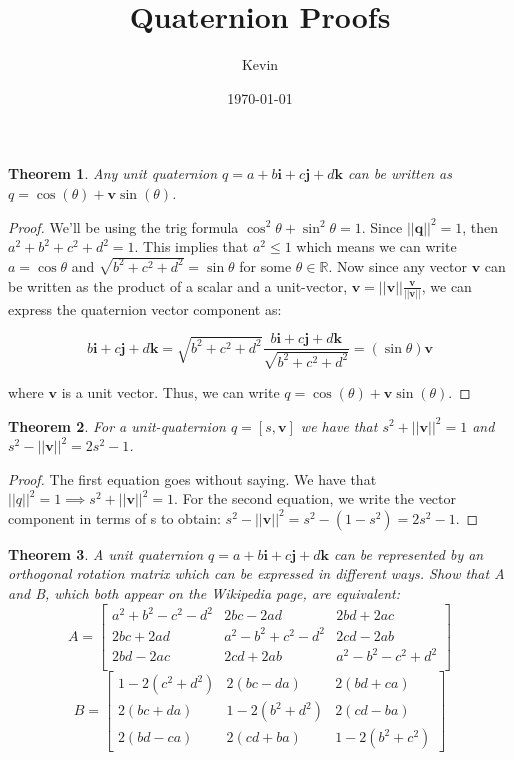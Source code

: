 \documentclass[a4paper,12pt]{article}
\author{Kevin}
\title{Quaternion Proofs}
\date{\today}
\newtheorem{theorem}{Theorem}
\begin{document}
\maketitle

\begin{theorem}
Any unit quaternion $q = a + b \mathbf{i} + c \mathbf{j} + d \mathbf{k}$ can be written as $q = \cos{(\theta)} + \mathbf{v}\sin{(\theta)}$.
\end{theorem}

\begin{proof}
We'll be using the trig formula $\cos^2\theta + \sin^2\theta = 1$. Since $||\mathbf{q}||^2 = 1$, then $a^2 + b^2 + c^2 + d^2 = 1$. This implies that $a^2 \leq1$ which means we can write $a = \cos{\theta}$ and $\sqrt{b^2 + c^2 + d^2} = \sin{\theta}$ for some $\theta \in \mathbb{R}$. Now since any vector $\mathbf{v}$ can be written as the product of a scalar and a unit-vector, $\mathbf{v}= ||\mathbf{v}|| \frac{\mathbf{v}}{||\mathbf{v}||}$, we can express the quaternion vector component as:

$$b \mathbf{i} + c \mathbf{j} + d \mathbf{k} = \sqrt{b^2 + c^2 + d^2} \frac{b \mathbf{i} + c \mathbf{j} + d \mathbf{k} }{\sqrt{b^2 + c^2 + d^2}} = (\sin{\theta})\mathbf{v}
$$

where $\mathbf{v}$ is a unit vector. Thus, we can write $q = \cos{(\theta)} + \mathbf{v}\sin{(\theta)}.$
\end{proof}

\begin{theorem}
For a unit-quaternion $q = [s, \mathbf{v}]$ we have that $s^2 + ||\mathbf{v}||^2 = 1$ and $s^2 - ||\mathbf{v}||^2 = 2s^2 -1$.
\end{theorem}

\begin{proof}
The first equation goes without saying. We have that $||q||^2 = 1 \implies s^2 + ||\mathbf{v}||^2 = 1.$ For the second equation, we write the vector component in terms of s to obtain: $s^2 - ||\mathbf{v}||^2 = s^2 - (1 - s^2) = 2s^2 - 1$.
\end{proof}

\begin{theorem}
A unit quaternion $q = a + b\mathbf{i} + c\mathbf{j} + d\mathbf{k}$ can be represented by an orthogonal rotation matrix which can be expressed in different ways. Show that A and B, which both appear on the Wikipedia page, are equivalent:
$$
A = \begin{bmatrix}
a^2+b^2-c^2-d^2&2bc-2ad        &2bd+2ac        \\
2bc+2ad        &a^2-b^2+c^2-d^2&2cd-2ab        \\
2bd-2ac        &2cd+2ab        &a^2-b^2-c^2+d^2\\
\end{bmatrix}
$$
$$
B = \begin{bmatrix}
1 - 2(c^2 + d^2) & 2(bc - da) & 2(bd + ca) \\
2(bc + da) & 1 - 2(b^2 + d^2) & 2(cd - ba) \\
2(bd - ca) & 2(cd + ba) & 1 - 2(b^2 + c^2)
\end{bmatrix}
$$
\end{theorem}
\end{document}
